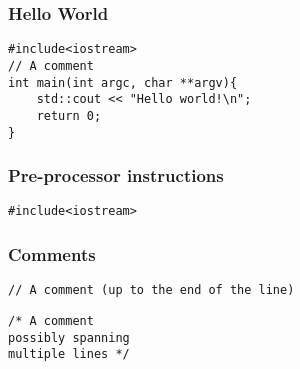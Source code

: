 
\begin{frame}
\end{frame}

\begin{frame}[fragile]
\frametitle{Hello World}
\begin{lstlisting}
#include<iostream>
// A comment
int main(int argc, char **argv){
    std::cout << "Hello world!\n";
    return 0;
}
\end{lstlisting}
\end{frame}

\begin{frame}[fragile]
\frametitle{Pre-processor instructions}
\begin{lstlisting}
#include<iostream>
\end{lstlisting}
\end{frame}

\begin{frame}[fragile]
\frametitle{Comments}
\begin{lstlisting}[firstnumber=2]
// A comment (up to the end of the line)
\end{lstlisting}
\begin{lstlisting}[firstnumber=2]
/* A comment 
possibly spanning
multiple lines */
\end{lstlisting}
\end{frame}

